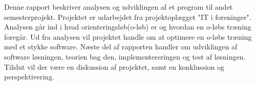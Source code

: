 Denne rapport beskriver analysen og udviklingen af et program til andet semesterprojekt. Projektet er udarbejdet fra projektoplægget "IT i foreninger". Analysen går ind i hvad orienteringsløb(o-løb) er og hvordan en o-løbs træning foregår. Ud fra analysen vil projektet handle om at optimere en o-løbs træning med et stykke software. Næste del af rapporten handler om udviklingen af software løsningen, teorien bag den, implementereringen og test af løsningen. Tilslut vil der være en diskussion af projektet, samt en konklussion og perspektivering.
